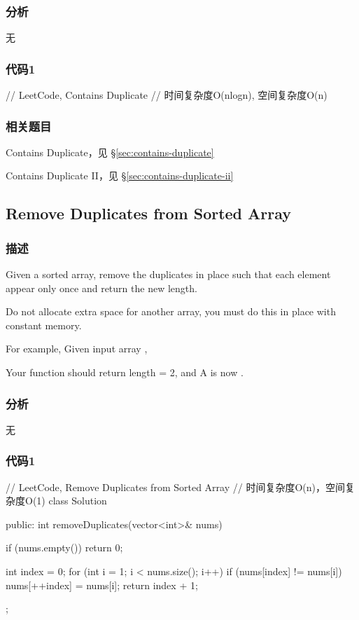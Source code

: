 \subsubsection{分析}
无


\subsubsection{代码1}
\begin{Code}
// LeetCode, Contains Duplicate
// 时间复杂度O(nlogn), 空间复杂度O(n)


\end{Code}


\subsubsection{相关题目}

\begindot
\item Contains Duplicate，见 \S \ref{sec:contains-duplicate}
\item Contains Duplicate II，见 \S \ref{sec:contains-duplicate-ii}
\myenddot


\subsection{Remove Duplicates from Sorted Array}
\label{sec:remove-duplicates-from-sorted-array}


\subsubsection{描述}
Given a sorted array, remove the duplicates in place such that each element appear only once and return the new length.

Do not allocate extra space for another array, you must do this in place with constant memory.

For example, Given input array ,

Your function should return length = 2, and A is now \code{[1,2]}.


\subsubsection{分析}
无


\subsubsection{代码1}
\begin{Code}
// LeetCode, Remove Duplicates from Sorted Array
// 时间复杂度O(n)，空间复杂度O(1)
class Solution {
public:
    int removeDuplicates(vector<int>& nums) {
        if (nums.empty()) return 0;

        int index = 0;
        for (int i = 1; i < nums.size(); i++) {
            if (nums[index] != nums[i])
                nums[++index] = nums[i];
        }
        return index + 1;
    }
};
\end{Code}


